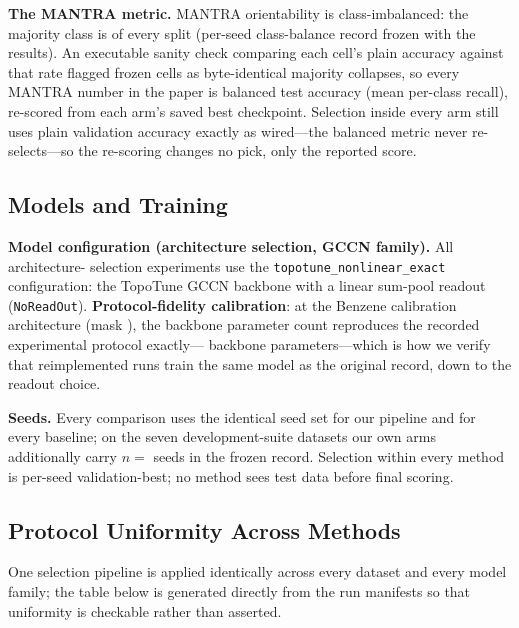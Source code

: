 \textbf{The MANTRA metric.} MANTRA orientability is class-imbalanced:
the majority class is \unfrozen{\ResMantraMajorityRate} of every
split (per-seed class-balance record frozen with the results). An
executable sanity check comparing each cell's plain accuracy against
that rate flagged \unfrozen{\ResMantraCollapsedModels} frozen cells
as byte-identical majority collapses, so every MANTRA number in the
paper is balanced test accuracy (mean per-class recall), re-scored
from each arm's saved best checkpoint. Selection inside every arm
still uses plain validation accuracy exactly as wired---the balanced
metric never re-selects---so the re-scoring changes no pick, only the
reported score.

\subsection{Models and Training}
\label{app:models-training}

\textbf{Model configuration (architecture selection, GCCN family).} All architecture-%
selection experiments use the \texttt{topotune\_nonlinear\_exact}
configuration: the TopoTune GCCN backbone with a linear sum-pool readout
(\texttt{NoReadOut}). \textbf{Protocol-fidelity calibration}: at the
Benzene calibration architecture (mask \unfrozen{\ResCalibMaskID}), the
backbone parameter count reproduces the recorded experimental protocol
exactly---\unfrozen{\ResCalibBackboneParams} backbone parameters---which
is how we verify that reimplemented runs train the same model as the
original record, down to the readout choice.

\textbf{Seeds.} Every comparison uses the identical seed set
\unfrozen{\ResSeedList} for our pipeline and for every baseline; on
the seven development-suite datasets our own arms additionally carry
$n=$ \unfrozen{\ResOurReplications} seeds in the frozen record.
Selection within every method is per-seed
validation-best; no method sees test data before final scoring.

\subsection{Protocol Uniformity Across Methods}
\label{app:protocol-uniformity}

One selection pipeline is applied identically across every dataset and
every model family; the table below is generated directly from the run
manifests so that uniformity is checkable rather than asserted.


